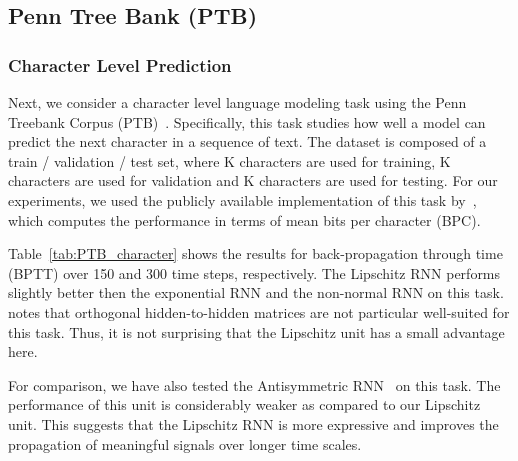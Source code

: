 \documentclass{article} \usepackage{iclr2021_conference,times}
\begin{document}
\subsection{Penn Tree Bank (PTB)}

\subsubsection{Character Level Prediction}\label{sec:ptb_character}

Next, we consider a character level language modeling task using the Penn Treebank Corpus (PTB)~\citep{marcus1993building}. Specifically, this task studies how well a model can predict the next character in a sequence of text.
The dataset is composed of a train / validation / test set, where K characters are used for training, K characters are used for validation and K characters are used for testing.  
For our experiments, we used the publicly available implementation of this task by~\citet{kerg2019non}, which computes the performance in terms of mean bits per character (BPC).

Table~\ref{tab:PTB_character} shows the results for back-propagation through time (BPTT) over 150 and 300 time steps, respectively. The Lipschitz RNN performs slightly better then the exponential RNN and the non-normal RNN on this task. \citep{kerg2019non} notes that orthogonal hidden-to-hidden matrices are not particular well-suited for this task. Thus, it is not surprising that the Lipschitz unit has a small advantage here. 

For comparison, we have also tested the Antisymmetric RNN~\citep{chang2018antisymmetricrnn} on this task. The performance of this unit is considerably weaker as compared to our Lipschitz unit. 
This suggests that the Lipschitz RNN is more expressive and improves the propagation of meaningful signals over longer time scales.
\end{document}

